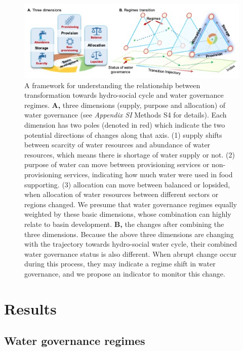 \documentclass[9pt, twocolumn, twoside, lineno]{pnas-new}
\begin{document}
\begin{figure}%
	\centering
	\includegraphics[width=0.8\linewidth]{../../figures/main/framework.jpg}
	\caption{
		A framework for understanding the relationship between transformation towards hydro-social cycle and water governance regimes.
		\textbf{A,} three dimensions (supply, purpose and allocation) of water governance (see \textit{Appendix SI} Methods S4 for details). Each dimension has two poles (denoted in red) which indicate the two potential directions of changes along that axis. (1) supply shifts between scarcity of water resources and abundance of water resources, which means there is shortage of water supply or not. (2) purpose of water can move between provisioning services or non-provisioning services, indicating how much water were used in food supporting. (3) allocation can move between balanced or lopsided, when allocation of water resources between different sectors or regions changed. We presume that water governance regimes equally weighted by these basic dimensions, whose combination can highly relate to basin development. 
		\textbf{B,} the changes after combining the three dimensions. Because the above three dimensions are changing with the trajectory towards hydro-social water cycle, their combined water governance status is also different. When abrupt change occur during this process, they may indicate a regime shift in water governance, and we propose an indicator to monitor this change.
	}
	\label{fig:framework}
\end{figure}


\section*{Results}
\subsection*{Water governance regimes}
\end{document}
